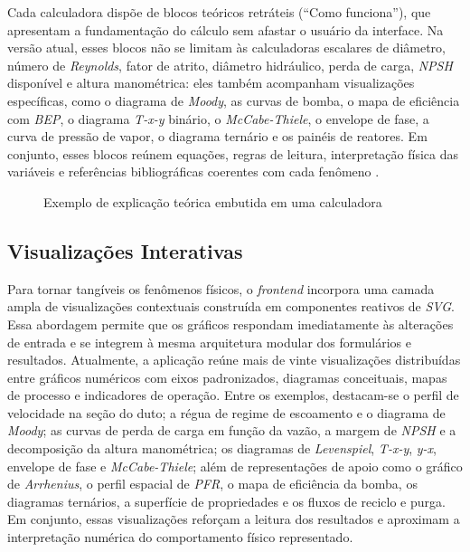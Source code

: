 Cada calculadora dispõe de blocos teóricos retráteis (``Como funciona''), que apresentam a fundamentação do cálculo sem afastar o usuário da interface. Na versão atual, esses blocos não se limitam às calculadoras escalares de diâmetro, número de \textit{Reynolds}, fator de atrito, diâmetro hidráulico, perda de carga, \textit{NPSH} disponível e altura manométrica: eles também acompanham visualizações específicas, como o diagrama de \textit{Moody}, as curvas de bomba, o mapa de eficiência com \textit{BEP}, o diagrama \textit{T-x-y} binário, o \textit{McCabe-Thiele}, o envelope de fase, a curva de pressão de vapor, o diagrama ternário e os painéis de reatores. Em conjunto, esses blocos reúnem equações, regras de leitura, interpretação física das variáveis e referências bibliográficas coerentes com cada fenômeno \cite{white2018,perry2007,fogler2009,smith2018,mccabe2005,poling2001,seader2016,karassik2008,bell2014}.

\begin{figure}[H]
    \centering
    \caption{Exemplo de explicação teórica embutida em uma calculadora}
    \label{fig:explicacao_teorica}
\end{figure}

\subsection{Visualizações Interativas}

Para tornar tangíveis os fenômenos físicos, o \textit{frontend} incorpora uma camada ampla de visualizações contextuais construída em componentes reativos de \textit{SVG}. Essa abordagem permite que os gráficos respondam imediatamente às alterações de entrada e se integrem à mesma arquitetura modular dos formulários e resultados. Atualmente, a aplicação reúne mais de vinte visualizações distribuídas entre gráficos numéricos com eixos padronizados, diagramas conceituais, mapas de processo e indicadores de operação. Entre os exemplos, destacam-se o perfil de velocidade na seção do duto; a régua de regime de escoamento e o diagrama de \textit{Moody}; as curvas de perda de carga em função da vazão, a margem de \textit{NPSH} e a decomposição da altura manométrica; os diagramas de \textit{Levenspiel}, \textit{T-x-y}, \textit{y-x}, envelope de fase e \textit{McCabe-Thiele}; além de representações de apoio como o gráfico de \textit{Arrhenius}, o perfil espacial de \textit{PFR}, o mapa de eficiência da bomba, os diagramas ternários, a superfície de propriedades e os fluxos de reciclo e purga. Em conjunto, essas visualizações reforçam a leitura dos resultados e aproximam a interpretação numérica do comportamento físico representado.

